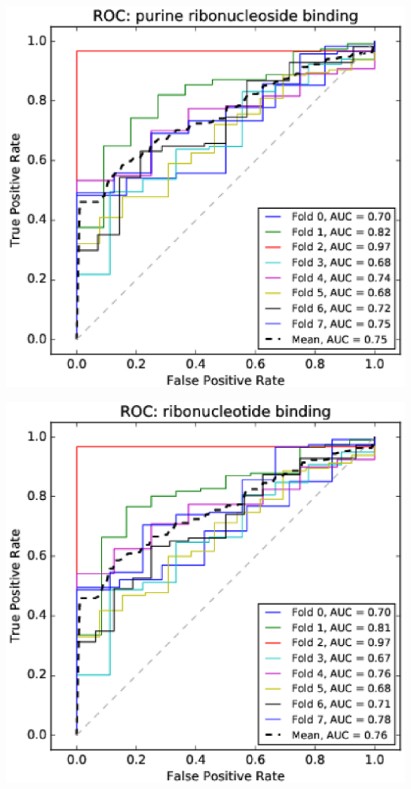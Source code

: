 \documentclass[11pt,twoside,a4paper]{book}
\newenvironment{Figure}
  {\par\medskip\noindent\minipage{\linewidth}}
  {\endminipage\par\medskip}
\begin{document}
\begin{multicols}{2}
\begin{Figure}\begin{center}\includegraphics[width=\linewidth]{figures/roc_purine_ribonucleoside_binding}\label{fig:roc_purine_ribonucleoside_binding}\end{center}\end{Figure}
\begin{Figure}\begin{center}\includegraphics[width=\linewidth]{figures/roc_ribonucleotide_binding}\label{fig:roc_ribonucleotide_binding}\end{center}\end{Figure}

\end{multicols}
\end{document}
